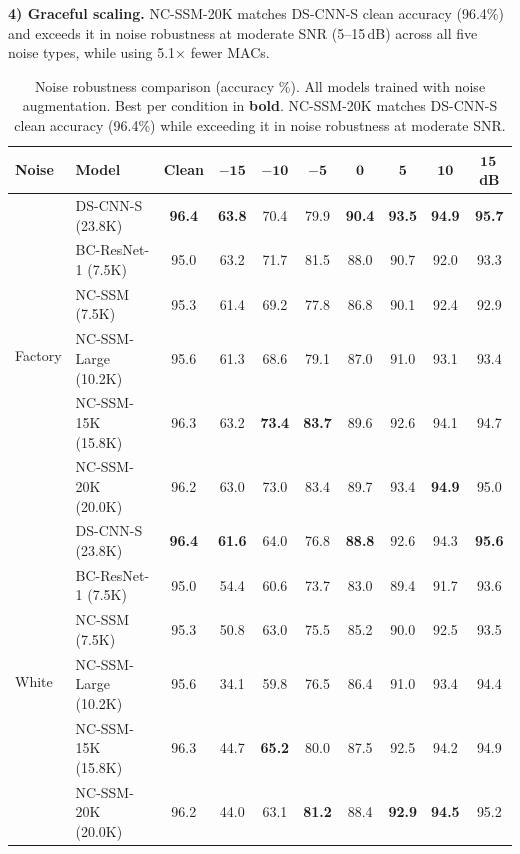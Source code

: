 \documentclass[journal]{IEEEtran}
\begin{document}
\smallskip\noindent\textbf{4) Graceful scaling.}
NC-SSM-20K matches DS-CNN-S clean accuracy (96.4\%) and exceeds it in noise robustness at moderate SNR (5--15\,dB) across all five noise types, while using 5.1$\times$ fewer MACs.

\begin{table}[t]
\centering
\caption{Noise robustness comparison (accuracy \%). All models trained with noise augmentation. Best per condition in \textbf{bold}. NC-SSM-20K matches DS-CNN-S clean accuracy (96.4\%) while exceeding it in noise robustness at moderate SNR.}
\label{tab:noise_main}
\small
\begin{tabular}{ll|cccccccc}
\toprule
\textbf{Noise} & \textbf{Model} & \textbf{Clean} & $\mathbf{-15}$ & $\mathbf{-10}$ & $\mathbf{-5}$ & $\mathbf{0}$ & $\mathbf{5}$ & $\mathbf{10}$ & $\mathbf{15}$\,\textbf{dB} \\
\midrule
\multirow{6}{*}{Factory}
  & DS-CNN-S (23.8K)       & \textbf{96.4} & \textbf{63.8} & 70.4 & 79.9 & \textbf{90.4} & \textbf{93.5} & \textbf{94.9} & \textbf{95.7} \\
  & BC-ResNet-1 (7.5K)     & 95.0 & 63.2 & 71.7 & 81.5 & 88.0 & 90.7 & 92.0 & 93.3 \\
\cmidrule{2-10}
  & NC-SSM (7.5K)          & 95.3 & 61.4 & 69.2 & 77.8 & 86.8 & 90.1 & 92.4 & 92.9 \\
  & NC-SSM-Large (10.2K)   & 95.6 & 61.3 & 68.6 & 79.1 & 87.0 & 91.0 & 93.1 & 93.4 \\
  & NC-SSM-15K (15.8K) & 96.3 & 63.2 & \textbf{73.4} & \textbf{83.7} & 89.6 & 92.6 & 94.1 & 94.7 \\
  & NC-SSM-20K (20.0K) & 96.2 & 63.0 & 73.0 & 83.4 & 89.7 & 93.4 & \textbf{94.9} & 95.0 \\
\midrule
\multirow{6}{*}{White}
  & DS-CNN-S (23.8K)       & \textbf{96.4} & \textbf{61.6} & 64.0 & 76.8 & \textbf{88.8} & 92.6 & 94.3 & \textbf{95.6} \\
  & BC-ResNet-1 (7.5K)     & 95.0 & 54.4 & 60.6 & 73.7 & 83.0 & 89.4 & 91.7 & 93.6 \\
\cmidrule{2-10}
  & NC-SSM (7.5K)          & 95.3 & 50.8 & 63.0 & 75.5 & 85.2 & 90.0 & 92.5 & 93.5 \\
  & NC-SSM-Large (10.2K)   & 95.6 & 34.1 & 59.8 & 76.5 & 86.4 & 91.0 & 93.4 & 94.4 \\
  & NC-SSM-15K (15.8K) & 96.3 & 44.7 & \textbf{65.2} & 80.0 & 87.5 & 92.5 & 94.2 & 94.9 \\
  & NC-SSM-20K (20.0K) & 96.2 & 44.0 & 63.1 & \textbf{81.2} & 88.4 & \textbf{92.9} & \textbf{94.5} & 95.2 \\

\end{tabular}
\end{table}
\end{document}
